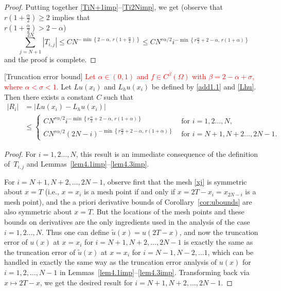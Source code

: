 \documentclass[smallextended]{svjour3}       %
\newcommand{\tcr}[1]{\textcolor{red}{#1}}
\begin{document}
\begin{proof}
Putting together \eqref{TiN+1imp}--\eqref{Ti2Nimp}, we get (observe that $r\left(1+\frac{\alpha}{2}\right)\ge2$ 
implies that\\ $r\left(1+\frac{\alpha}{2}\right)> 2-\alpha$)
\[
\sum_{j=N+1}^{2N} |T_{i,j}| \le C N^{-\min \left\{2-\alpha, \,r\left(1+\frac{\alpha}{2}\right)\right\}}
	\le C N^{r\alpha/2}  i^{-\min \left\{r\frac{\alpha}{2}+2-\alpha, \,r(1+\alpha)\right\}}
\]
and 	the proof is complete.
\end{proof}

\begin{lemma}\label{lem4.4imp}[Truncation error bound]
\tcr{Let $\alpha\in(0,1)$ and $f\in C^\beta(\Omega)$ with $\beta = 2-\alpha+\sigma$, where $\alpha < \sigma < 1$.}
Let $Lu(x_i)$ and $L_hu(x_i)$ be defined by \eqref{add1.1} and \eqref{Lhu}. Then there exists a constant $C$ such that
\begin{align*}
|R_i| & =\left|Lu(x_i) - L_hu(x_i) \right| \\
	& \leq
		\begin{cases}
			C N^{r\alpha/2} i^{-\min\left\{r\frac{\alpha}{2}+2-\alpha, \,r(1+\alpha)\right\}}
			&\text{ for } i=1,2\dots, N, \\
			C N^{r\alpha/2}(2N-i)^{-\min\left\{r\frac{\alpha}{2}+2-\alpha, \,r(1+\alpha)\right\}}
			&\text{ for } i=N+1,N+2\dots, 2N-1.
		\end{cases}
	\end{align*}
\end{lemma}
\begin{proof}
For $i=1,2\dots, N$, this result is an immediate consequence of the definition of~$T_{i,j}$ 
and Lemmas~\ref{lem4.1imp}--\ref{lem4.3imp}.
	
	For $i=N+1, N+2,\dots,2N-1$, observe first that the mesh \eqref{xj} is symmetric about $x=T$ (i.e., $x=x_i$ is a mesh point if and only if $x=2T-x_i=x_{2N-i}$ is a mesh point), and the a priori derivative bounds of Corollary~\ref{cor:ubounds} are also symmetric about $x=T$. But the locations of the mesh points and these bounds on derivatives are the only ingredients used in the analysis of the case $i=1,2\dots, N$.
	Thus one can define $\tilde u(x)=u(2T-x)$, and now the truncation error of $u(x)$ at $x=x_i$ for $i=N+1, N+2,\dots,2N-1$ is exactly the same as the truncation error of $\tilde u(x)$ at $x=x_i$ for $i=N-1, N-2, \dots 1$, which can be handled in exactly the same way as the truncation error analysis of $u(x)$ for $i=1,2,\dots,N-1$ in Lemmas~\ref{lem4.1imp}--\ref{lem4.3imp}. Transforming back via $x\mapsto 2T-x$, we get the desired result for $i=N+1, N+2,\dots,2N-1$.
\end{proof}
\end{document}
